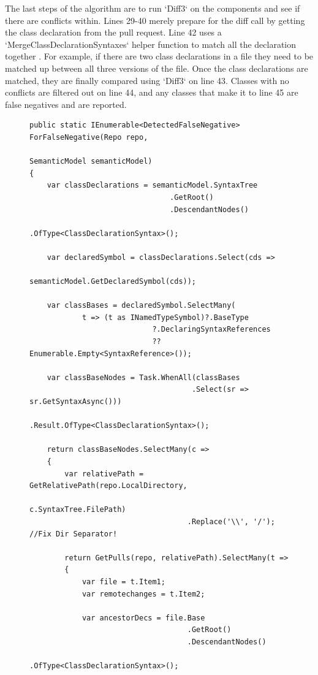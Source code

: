 \documentclass[draftclsnofoot,onecolumn]{IEEEtran}
\begin{document}
The last steps of the algorithm are to run `Diff3` on the components and see if 
there are conflicts within. Lines 29-40 merely prepare for the diff call by 
getting the class declaration from the pull request. Line 42 uses a 
`MergeClassDeclarationSyntaxes` helper function to match all the declaration 
together . For example, if there are two class declarations in a file they need 
to be matched up between all three versions of the file. Once the class 
declarations are matched, they are finally compared using `Diff3` on line 43. 
Classes with no conflicts are filtered out on line 44, and any classes that 
make it to line 45 are false negatives and are reported.

\begin{figure}[!t]
\centering
\begin{lstlisting}
public static IEnumerable<DetectedFalseNegative> ForFalseNegative(Repo repo,
                                                   SemanticModel semanticModel)
{
    var classDeclarations = semanticModel.SyntaxTree
                                .GetRoot()
                                .DescendantNodes()
                                .OfType<ClassDeclarationSyntax>();

    var declaredSymbol = classDeclarations.Select(cds => 
	                                     semanticModel.GetDeclaredSymbol(cds));

    var classBases = declaredSymbol.SelectMany(
            t => (t as INamedTypeSymbol)?.BaseType
                            ?.DeclaringSyntaxReferences 
							?? Enumerable.Empty<SyntaxReference>());

    var classBaseNodes = Task.WhenAll(classBases
	                                 .Select(sr => sr.GetSyntaxAsync()))
                           .Result.OfType<ClassDeclarationSyntax>();

    return classBaseNodes.SelectMany(c =>
    {
        var relativePath = GetRelativePath(repo.LocalDirectory, 
		                                                 c.SyntaxTree.FilePath)
                                    .Replace('\\', '/'); //Fix Dir Separator!

        return GetPulls(repo, relativePath).SelectMany(t =>
        {
            var file = t.Item1;
            var remotechanges = t.Item2;

            var ancestorDecs = file.Base
                                    .GetRoot()
                                    .DescendantNodes()
                                    .OfType<ClassDeclarationSyntax>();


\end{lstlisting}
\end{figure}
\end{document}
